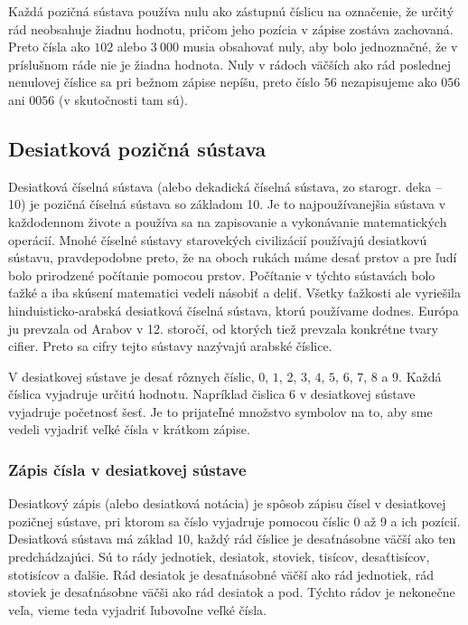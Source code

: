 \documentclass{report}
\begin{document}
Každá pozičná sústava používa nulu ako zástupnú číslicu na označenie, že určitý rád neobsahuje žiadnu hodnotu, pričom jeho pozícia v zápise zostáva zachovaná. Preto čísla ako \(102\) alebo \(3\ 000\) musia obsahovať nuly, aby bolo jednoznačné, že v príslušnom ráde nie je žiadna hodnota. Nuly v rádoch väčších ako rád poslednej nenulovej číslice sa pri bežnom zápise nepíšu, preto číslo \(56\) nezapisujeme ako \(056\) ani \(0056\) (v skutočnosti tam sú).

\subsection{Desiatková pozičná sústava}

Desiatková číselná sústava (alebo dekadická číselná sústava, zo starogr. deka – 10) je pozičná číselná sústava so základom 10. Je to najpoužívanejšia sústava v každodennom živote a používa sa na zapisovanie a vykonávanie matematických operácií. Mnohé číselné sústavy starovekých civilizácií používajú desiatkovú sústavu, pravdepodobne preto, že na oboch rukách máme desať prstov a pre ľudí bolo prirodzené počítanie pomocou prstov. Počítanie v týchto sústavách bolo ťažké a iba skúsení matematici vedeli násobiť a deliť. Všetky ťažkosti ale vyriešila hinduisticko‑arabská desiatková číselná sústava, ktorú používame dodnes. Európa ju prevzala od Arabov v 12. storočí, od ktorých tiež prevzala konkrétne tvary cifier. Preto sa cifry tejto sústavy nazývajú arabské číslice.

V desiatkovej sústave je desať rôznych číslic, \(0\), \(1\), \(2\), \(3\), \(4\), \(5\), \(6\), \(7\), \(8\) a \(9\). Každá číslica vyjadruje určitú hodnotu. Napríklad čislica \(6\) v desiatkovej sústave vyjadruje početnosť šesť. Je to prijateľné množstvo symbolov na to, aby sme vedeli vyjadriť veľké čísla v krátkom zápise.

\subsubsection{Zápis čísla v desiatkovej sústave}

Desiatkový zápis (alebo desiatková notácia) je spôsob zápisu čísel v desiatkovej pozičnej sústave, pri ktorom sa číslo vyjadruje pomocou číslic 0 až 9 a ich pozícií. Desiatková sústava má základ \(10\), každý rád číslice je desaťnásobne väčší ako ten predchádzajúci. Sú to rády jednotiek, desiatok, stoviek, tisícov, desaťtisícov, stotisícov a ďalšie. Rád desiatok je desaťnásobné väčší ako rád jednotiek, rád stoviek je desaťnásobne väčši ako rád desiatok a pod. Týchto rádov je nekonečne veľa, vieme teda vyjadriť ľubovoľne veľké čísla.
\end{document}
